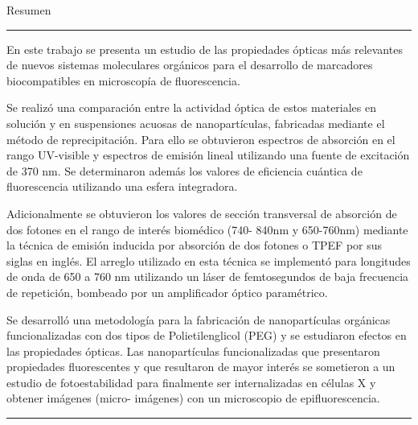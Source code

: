 \begin{vcenterpage}
{\LARGE{\sc Resumen}}

\noindent\rule[2pt]{\textwidth}{0.5pt}
En este trabajo se presenta un estudio de las propiedades \'opticas m\'as relevantes de nuevos sistemas moleculares org\'anicos para el desarrollo de marcadores biocompatibles en microscop\'ia de fluorescencia.

Se realiz\'o una comparaci\'on entre la actividad \'optica de estos materiales en soluci\'on y en suspensiones acuosas de nanopart\'iculas, fabricadas mediante el m\'etodo de reprecipitaci\'on. Para ello se obtuvieron espectros de absorci\'on en el rango UV-visible y espectros de emisi\'on lineal utilizando una fuente de excitaci\'on de 370 nm. Se determinaron adem\'as los valores de eficiencia cu\'antica de fluorescencia utilizando una esfera integradora. 

Adicionalmente se obtuvieron los valores de  secci\'on transversal de absorci\'on de dos fotones en el rango de inter\'es biom\'edico (740- 840nm y 650-760nm) mediante la t\'ecnica de emisi\'on inducida por absorci\'on de dos fotones o TPEF por sus siglas en ingl\'es. El arreglo utilizado en esta t\'ecnica se implement\'o para longitudes de onda de 650 a 760 nm utilizando un l\'aser de femtosegundos de baja frecuencia de repetici\'on, bombeado por un amplificador \'optico param\'etrico.
	
Se desarroll\'o una metodolog\'ia para la fabricaci\'on de nanopart\'iculas org\'anicas funcionalizadas con dos tipos de Polietilenglicol (PEG) y se estudiaron efectos en las propiedades \'opticas. Las nanopart\'iculas funcionalizadas que presentaron propiedades fluorescentes y que resultaron de mayor inter\'es se sometieron a un estudio de fotoestabilidad para finalmente ser internalizadas en c\'elulas X y obtener im\'agenes (micro- im\'agenes) con un microscopio de epifluorescencia.


\noindent\rule[2pt]{\textwidth}{0.5pt}
\end{vcenterpage}
